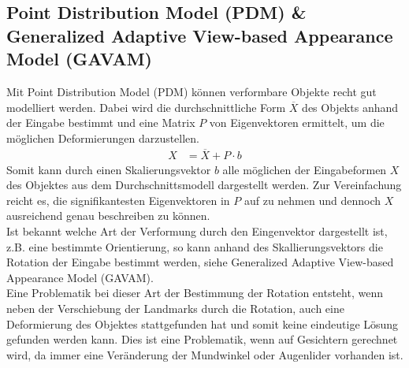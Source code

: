 \subsection{Point Distribution Model (PDM) \& Generalized Adaptive View-based Appearance Model (GAVAM)}
Mit Point Distribution Model (PDM) können verformbare Objekte recht gut modelliert werden. Dabei wird die durchschnittliche Form $\overline{X}$ des Objekts anhand der Eingabe bestimmt und eine Matrix $P$ von Eigenvektoren ermittelt, um die möglichen Deformierungen darzustellen.
\begin{align*}
X &= \overline{X}+P\cdot b
\end{align*}
Somit kann durch einen Skalierungsvektor $b$ alle möglichen der Eingabeformen $X$ des Objektes aus dem Durchschnittsmodell dargestellt werden. Zur Vereinfachung reicht es, die signifikantesten Eigenvektoren in $P$ auf zu nehmen und dennoch $X$ ausreichend genau beschreiben zu können.\\
Ist bekannt welche Art der Verformung durch den Eingenvektor dargestellt ist, z.B. eine bestimmte Orientierung, so kann anhand des Skallierungsvektors die Rotation der Eingabe bestimmt werden, siehe Generalized Adaptive View-based Appearance Model (GAVAM).\\
Eine Problematik bei dieser Art der Bestimmung der Rotation entsteht, wenn neben der Verschiebung der Landmarks durch die Rotation, auch eine Deformierung des Objektes stattgefunden hat und somit keine eindeutige Lösung gefunden werden kann. Dies ist eine Problematik, wenn auf Gesichtern gerechnet wird, da immer eine Veränderung der Mundwinkel oder Augenlider vorhanden ist.\\
\cite{wiki_PDM}\cite{pdf_PDM}\cite{pdf_GAVAM}